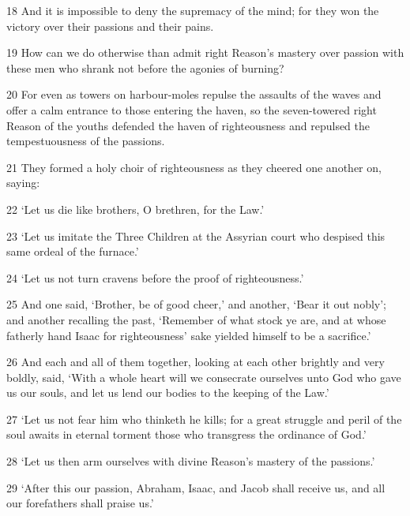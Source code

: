 \par 18 And it is impossible to deny the supremacy of the mind; for they won the victory over their passions and their pains.

\par 19 How can we do otherwise than admit right Reason's mastery over passion with these men who shrank not before the agonies of burning?

\par 20 For even as towers on harbour-moles repulse the assaults of the waves and offer a calm entrance to those entering the haven, so the seven-towered right Reason of the youths defended the haven of righteousness and repulsed the tempestuousness of the passions.

\par 21 They formed a holy choir of righteousness as they cheered one another on, saying:

\par 22 ‘Let us die like brothers, O brethren, for the Law.’

\par 23 ‘Let us imitate the Three Children at the Assyrian court who despised this same ordeal of the furnace.’

\par 24 ‘Let us not turn cravens before the proof of righteousness.’

\par 25 And one said, ‘Brother, be of good cheer,’ and another, ‘Bear it out nobly’; and another recalling the past, ‘Remember of what stock ye are, and at whose fatherly hand Isaac for righteousness' sake yielded himself to be a sacrifice.’

\par 26 And each and all of them together, looking at each other brightly and very boldly, said, ‘With a whole heart will we consecrate ourselves unto God who gave us our souls, and let us lend our bodies to the keeping of the Law.’

\par 27 ‘Let us not fear him who thinketh he kills; for a great struggle and peril of the soul awaits in eternal torment those who transgress the ordinance of God.’

\par 28 ‘Let us then arm ourselves with divine Reason's mastery of the passions.’

\par 29 ‘After this our passion, Abraham, Isaac, and Jacob shall receive us, and all our forefathers shall praise us.’


